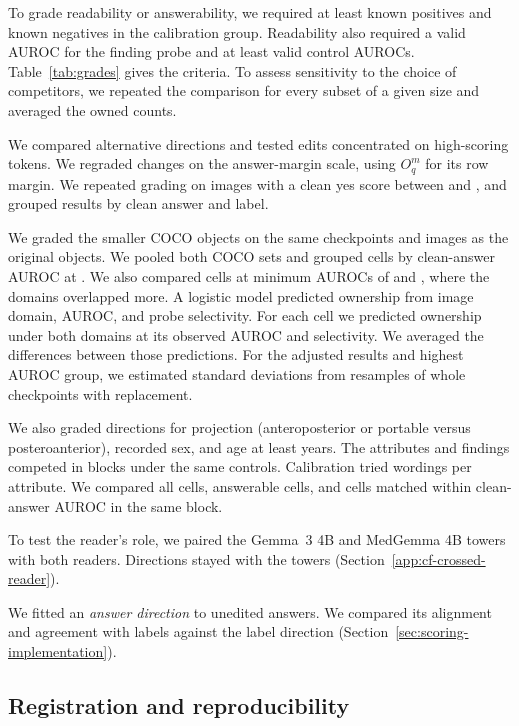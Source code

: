 To grade readability or answerability, we required at least \jnMinClassSupport{} known positives and \jnMinClassSupport{} known negatives in the calibration group. Readability also required a valid AUROC for the finding probe and at least \jnMinValidControls{} valid control AUROCs. Table~\ref{tab:grades} gives the criteria. To assess sensitivity to the choice of competitors, we repeated the comparison for every subset of a given size and averaged the owned counts.

We compared alternative directions and tested edits concentrated on high-scoring tokens. We regraded changes on the answer-margin scale, using $O_q^m$ for its row margin. We repeated grading on images with a clean yes score between \jnSaturationLow{} and \jnSaturationHigh{}, and grouped results by clean answer and label.

\label{app:cf-difficulty}
We graded the smaller COCO objects on the same checkpoints and images as the original objects. We pooled both COCO sets and grouped cells by clean-answer AUROC at \cfStratEdges{}. We also compared cells at minimum AUROCs of \jnCsAurocLower{} and \jnCsAurocHigher{}, where the domains overlapped more. A logistic model predicted ownership from image domain, AUROC, and probe selectivity. For each cell we predicted ownership under both domains at its observed AUROC and selectivity. We averaged the differences between those predictions. For the adjusted results and highest AUROC group, we estimated standard deviations from \jnBootstrapResamples{} resamples of whole checkpoints with replacement.

We also graded directions for projection (anteroposterior or portable versus posteroanterior), recorded sex, and age at least \jnAttributeAgeCutoff{} years. The attributes and findings competed in \cfAttrRefBlocks{} blocks under the same controls. Calibration tried \cfAttrqPhrasings{} wordings per attribute. We compared all cells, answerable cells, and cells matched within \cfAttrPairWindow{} clean-answer AUROC in the same block.

To test the reader's role, we paired the Gemma~3 4B and MedGemma 4B towers with both readers. Directions stayed with the towers (Section~\ref{app:cf-crossed-reader}).

We fitted an \emph{answer direction} to unedited answers. We compared its alignment and agreement with labels against the label direction (Section~\ref{sec:scoring-implementation}).

\subsection{Registration and reproducibility}
\label{app:repro}
\label{app:repro-protocol}

